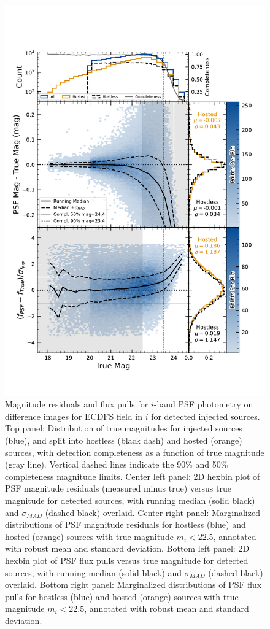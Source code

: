 \begin{figure}
\includegraphics[width=\linewidth]{hexbin_psf_magpull}
\caption{Magnitude residuals and flux pulls for $i$-band \gls{PSF} photometry on difference images for ECDFS field in $i$ for detected injected sources.
Top panel: Distribution of true magnitudes for injected sources (blue), and split  into hostless (black dash) and hosted (orange) sources, with detection completeness as a function of true magnitude (gray line). 
Vertical dashed lines indicate the 90\% and 50\% completeness magnitude limits.
Center left panel: 2D hexbin plot of PSF magnitude residuals (measured minus true) versus true magnitude for detected sources, with running median (solid black) and $\sigma_{MAD}$ (dashed black) overlaid.
Center right panel: Marginalized distributions of PSF magnitude residuals for hostless (blue) and hosted (orange) sources with true magnitude $m_i < 22.5$, annotated with robust mean and standard deviation. 
Bottom left panel: 2D hexbin plot of PSF flux pulls versus true magnitude for detected sources, with running median (solid black) and $\sigma_{MAD}$ (dashed black) overlaid.
Bottom right panel: Marginalized distributions of PSF flux pulls for hostless (blue) and hosted (orange) sources with true magnitude $m_i < 22.5$, annotated with robust mean and standard deviation.}
\label{fig:phot_residual_diffim_fakes}
\end{figure}
%
